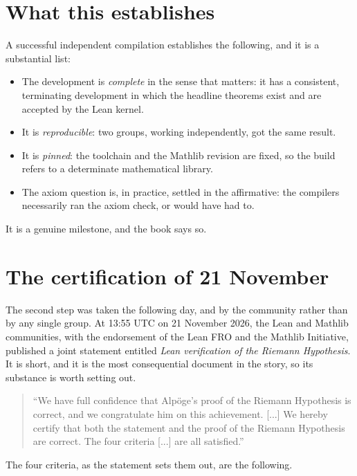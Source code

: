 \section{What this establishes}A successful independent compilation establishes the following, and it is a
substantial list:

\begin{itemize}
\item The development is \emph{complete} in the sense that matters: it has a
consistent, terminating development in which the headline theorems exist and
are accepted by the Lean kernel.
\item It is \emph{reproducible}: two groups, working independently, got the
same result.
\item It is \emph{pinned}: the toolchain and the Mathlib revision are fixed, so
the build refers to a determinate mathematical library.
\item The axiom question is, in practice, settled in the affirmative: the
compilers necessarily ran the axiom check, or would have had to.
\end{itemize}

It is a genuine milestone, and the book says so.

\section{The certification of 21 November}The second step was taken the following day, and by the community rather
than by any single group. At 13:55 UTC on 21 November 2026, the Lean and
Mathlib communities, with the endorsement of the Lean FRO and the Mathlib
Initiative, published a joint statement entitled \emph{Lean verification of
the Riemann Hypothesis}. It is short,
and it is the most consequential document in the story, so its substance is
worth setting out.

\begin{quote}
``We have full confidence that Alpöge's proof of the Riemann Hypothesis is
correct, and we congratulate him on this achievement. [...] We hereby certify
that both the statement and the proof of the Riemann Hypothesis are correct.
The four criteria [...] are all satisfied.''
\end{quote}

The four criteria, as the statement sets them out, are the following.

